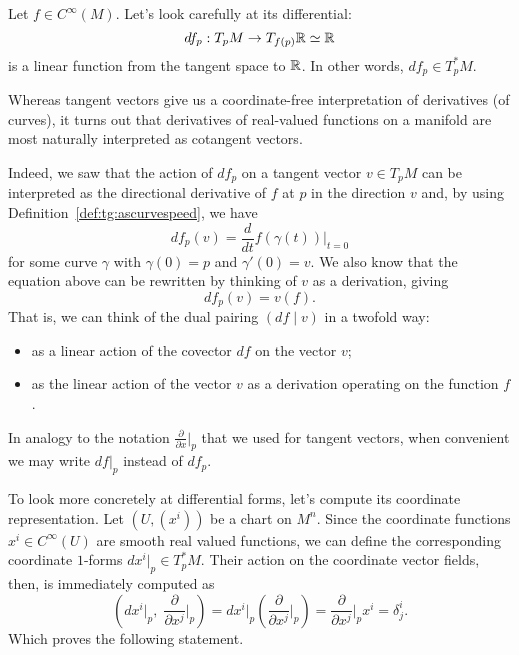 \begin{example}
  Let $f\in C^\infty(M)$.
  Let's look carefully at its differential:
  \begin{equation}
    df_p: T_p M \to T_{f(p)}\mathbb{R} \simeq \mathbb{R}
  \end{equation}
  is a linear function from the tangent space to $\mathbb{R}$.
  In other words, $df_p \in T_p^* M$.
\end{example}

Whereas tangent vectors give us a coordinate-free interpretation of derivatives (of curves), it turns out that derivatives of real-valued functions on a manifold are most naturally interpreted as cotangent vectors.

Indeed, we saw that the action of $df_p$ on a tangent vector $v\in T_p M$ can be interpreted as the directional derivative of $f$ at $p$ in the direction $v$ and, by using Definition~\ref{def:tg:ascurvespeed}, we have
\begin{equation}
  df_p(v) = \frac{d}{dt}f(\gamma(t))\Big|_{t=0}
\end{equation}
for some curve $\gamma$ with $\gamma(0) = p$ and $\gamma'(0)=v$.
We also know that the equation above can be rewritten by thinking of $v$ as a derivation, giving
\begin{equation}
  df_p(v) = v(f).
\end{equation}
That is, we can think of the dual pairing $(df\mid v)$ in a twofold way:
\begin{itemize}
  \item as a linear action of the covector $df$ on the vector $v$;
  \item as the linear action of the vector $v$ as a derivation operating on the function $f$.
\end{itemize}

\begin{notation}
  In analogy to the notation $\frac{\partial}{\partial x}\big|_p$ that we used for tangent vectors, when convenient we may write $df|_p$ instead of $df_p$.
\end{notation}

To look more concretely at differential forms, let's compute its coordinate representation.
Let $(U,(x^i))$ be a chart on $M^n$.
Since the coordinate functions $x^i\in C^\infty(U)$ are smooth real valued functions, we can define the corresponding coordinate $1$-forms $dx^i|_p \in T_p^* M$.
Their action on the coordinate vector fields, then, is immediately computed as
\begin{equation}
  \left(dx^i|_p ,\; \frac{\partial}{\partial x^j}\Big|_p\right) =
  dx^i|_p \left(\frac{\partial}{\partial x^j}\Big|_p\right)
  = \frac{\partial}{\partial x^j}\Big|_p x^i
  = \delta^i_j.
\end{equation}
Which proves the following statement.

